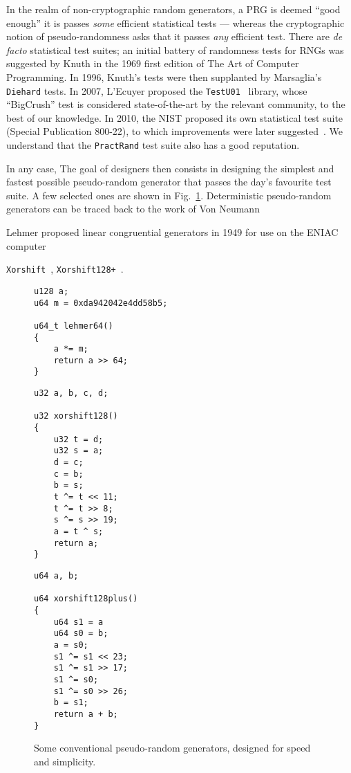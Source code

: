 \documentclass[submission,svgnames,journal=tosc]{iacrtrans}
\begin{document}
In the realm of non-cryptographic random generators, a PRG is deemed ``good
enough'' it is passes \emph{some} efficient statistical tests --- whereas the
cryptographic notion of pseudo-randomness asks that it passes \emph{any}
efficient test. There are \textit{de facto} statistical test suites; an initial
battery of randomness tests for RNGs was suggested by Knuth in the 1969 first
edition of The Art of Computer Programming. In 1996, Knuth's tests were then
supplanted by Marsaglia's \texttt{Diehard} tests. In 2007, L'Ecuyer proposed
the \texttt{TestU01}~\cite{LEcuyerS07} library, whose ``BigCrush'' test is
considered state-of-the-art by the relevant community, to the best of our
knowledge. In 2010, the NIST proposed its own statistical test suite (Special
Publication 800-22), to which improvements were later
suggested~\cite{ZhuMLZJ16}. We understand that the \texttt{PractRand} test suite
also has a good reputation.

In any case, The goal of designers then consists in designing the simplest and
fastest possible pseudo-random generator that passes the day's favourite test
suite. A few selected ones are shown in Fig.~\ref{fig:prngs}. Deterministic
pseudo-random generators can be traced back to the work of Von Neumann

Lehmer proposed
linear congruential generators in 1949 for use on the ENIAC computer~\cite{Lehmer}

\texttt{Xorshift}~\cite{Marsaglia03},
\texttt{Xorshift128+}~\cite{Vigna17}.

\begin{figure}
  \begin{minipage}[t]{5cm}
\begin{verbatim}
u128 a;
u64 m = 0xda942042e4dd58b5;

u64_t lehmer64() 
{
    a *= m;
    return a >> 64;
}
\end{verbatim}
  \end{minipage}
    \begin{minipage}[t]{4cm}
\begin{verbatim}
u32 a, b, c, d;

u32 xorshift128()
{
    u32 t = d;
    u32 s = a;
    d = c;
    c = b;
    b = s;
    t ^= t << 11;
    t ^= t >> 8;
    s ^= s >> 19;
    a = t ^ s;
    return a;
}
\end{verbatim}
    \end{minipage}
    \begin{minipage}[t]{4cm}
\begin{verbatim}
u64 a, b;

u64 xorshift128plus()
{
    u64 s1 = a
    u64 s0 = b;
    a = s0;
    s1 ^= s1 << 23;        
    s1 ^= s1 >> 17;        
    s1 ^= s0;        
    s1 ^= s0 >> 26;
    b = s1;
    return a + b;
}
\end{verbatim}
    \end{minipage}
    \caption{Some conventional pseudo-random generators, designed for speed and simplicity.}
    \label{fig:prngs}
  \end{figure}
\end{document}
